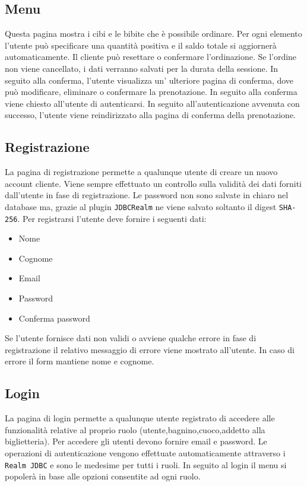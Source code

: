 \documentclass{article}
\begin{document}
\subsection{Menu}
Questa pagina mostra i cibi e le bibite che è possibile ordinare. Per ogni elemento l'utente può specificare una quantità positiva e il saldo totale si aggiornerà automaticamente. Il cliente può resettare o confermare l'ordinazione. Se l'ordine non viene cancellato, i dati verranno salvati per la durata della sessione. In seguito alla conferma, l'utente visualizza un' ulteriore pagina di conferma, dove può modificare, eliminare o confermare la prenotazione. In seguito alla conferma viene chiesto all'utente di autenticarsi. In seguito all'autenticazione avvenuta con successo, l'utente viene reindirizzato alla pagina di conferma della prenotazione.
\subsection{Registrazione}
La pagina di registrazione permette a qualunque utente di creare un nuovo account cliente. Viene sempre effettuato un controllo sulla validità dei dati forniti dall'utente in fase di registrazione. Le password non sono salvate in chiaro nel database ma, grazie al plugin \texttt{JDBCRealm} ne viene salvato soltanto il digest \texttt{SHA-256}.
Per registrarsi l'utente deve fornire i seguenti dati:
\begin{itemize}
	\item Nome
	\item Cognome
	\item Email
	\item Password
	\item Conferma password
\end{itemize}
Se l'utente fornisce dati non validi o avviene qualche errore in fase di registrazione il relativo messaggio di errore viene mostrato all'utente. In caso di errore il form mantiene nome e cognome.

\subsection{Login}
La pagina di login permette a qualunque utente registrato di accedere alle funzionalità relative al proprio ruolo (utente,bagnino,cuoco,addetto alla biglietteria). Per accedere gli utenti devono fornire email e password. Le operazioni di autenticazione vengono effettuate automaticamente attraverso i \texttt{Realm JDBC} e sono le medesime per tutti i ruoli. In seguito al login il menu si popolerà in base alle opzioni consentite ad ogni ruolo.
\end{document}
